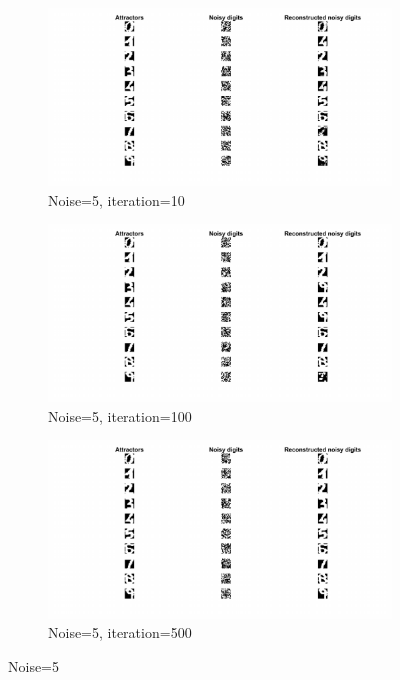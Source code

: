 \documentclass{article}
\begin{document}
\begin{figure}[h!]
     \centering
     \begin{subfigure}[b]{0.3\textwidth}
         \centering
         \includegraphics[width=\textwidth]{lab2/noise5ite10.pdf}
         \caption{Noise=5, iteration=10}
         \label{fig:noise5ite10}
     \end{subfigure}
     \hfill
     \begin{subfigure}[b]{0.3\textwidth}
         \centering
         \includegraphics[width=\textwidth]{lab2/noise5ite100.pdf}
         \caption{Noise=5, iteration=100}
         \label{fig:noise5ite100}
     \end{subfigure}
     \hfill
     \begin{subfigure}[b]{0.3\textwidth}
         \centering
         \includegraphics[width=\textwidth]{lab2/noise5ite500.pdf}
         \caption{Noise=5, iteration=500}
         \label{fig:noise5ite500}
     \end{subfigure}
        \caption{Noise=5}
        \label{fig:hopnoise5}
\end{figure}
\end{document}
